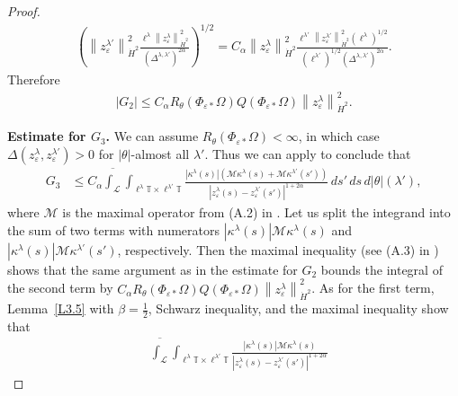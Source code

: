 \documentclass[reqno,centertags,12pt]{amsart}
\theoremstyle{definition}
\numberwithin{equation}{section}
\newcommand{\abs}[1]{\left\lvert#1\right\rvert}
\newcommand{\norm}[1]{\left\|#1\right\|}
\newcommand{\bbT}{{\mathbb{T}}}
\newcommand{\eps}{\varepsilon}
\newcommand{\tht}{\theta}
\begin{document}
\begin{proof}
\begin{align*}
        \left(
            \norm{z_{\eps}^{\lambda'}}_{\dot{H}^{2}}^{2}
            \frac{\ell^{\lambda}\norm{z_{\eps}^{\lambda}}_{\dot{H}^{2}}^{2}}
            {(\Delta^{\lambda,\lambda'})^{2\alpha}}
        \right)^{1/2}
        = C_{\alpha}\norm{z_{\eps}^{\lambda}}_{\dot{H}^{2}}^{2}
        \frac{\ell^{\lambda'}\norm{z_{\eps}^{\lambda'}}_{\dot{H}^{2}}^{2} 
        (\ell^{\lambda})^{1/2}}
        {(\ell^{\lambda'})^{1/2}(\Delta^{\lambda,\lambda'})^{2\alpha}}.
    \end{align*}
    Therefore
    \begin{align*}
        \abs{G_{2}} \leq C_{\alpha}R_{\tht}(\Phi_{\eps*}\Omega)
        Q(\Phi_{\eps*}\Omega)\norm{z_{\eps}^{\lambda}}_{\dot{H}^{2}}^{2}.
    \end{align*}

    \textbf{Estimate for $G_{3}$.} We can assume $R_{\tht}(\Phi_{\eps*}\Omega)<\infty$,
    in which case $\Delta(z_{\eps}^{\lambda},z_{\eps}^{\lambda'}) > 0$
    for $|\theta|$-almost all $\lambda'$.  Thus we can apply \cite[Lemma~A.4]{JeoZlaTouching}
    to conclude that
    \begin{align*}
        G_{3} &\leq C_{\alpha}\overline{\int_{\mathcal{L}}}
        \int_{\ell^{\lambda}\bbT\times \ell^{\lambda'}\bbT}
        \frac{\abs{\kappa^{\lambda}(s)}\left(
            \mathcal{M}\kappa^{\lambda}(s)
            + \mathcal{M}\kappa^{\lambda'}(s')
        \right)}
        {\abs{z_{\eps}^{\lambda}(s) - z_{\eps}^{\lambda'}(s')}^{1+2\alpha}}
        \,ds'\,ds\,d|\theta|(\lambda'),
    \end{align*}
    where $\mathcal{M}$ is the maximal operator from (A.2) in \cite{JeoZlaTouching}.
    Let us split the integrand into the sum of two terms with numerators
    $\abs{\kappa^{\lambda}(s)}\mathcal{M}\kappa^{\lambda}(s)$ and
    $\abs{\kappa^{\lambda}(s)}\mathcal{M}\kappa^{\lambda'}(s')$, respectively.  Then
     the maximal inequality (see (A.3) in \cite{JeoZlaTouching}) shows that  the same argument
    as in the estimate for $G_{2}$ bounds the integral of the second term by
    $C_{\alpha}R_{\tht}(\Phi_{\eps*}\Omega)Q(\Phi_{\eps*}\Omega)
    \norm{z_{\eps}^{\lambda}}_{\dot{H}^{2}}^{2}$.
    As for the first term, Lemma~\ref{L3.5} with $\beta=\frac 12$, Schwarz inequality, and
    the maximal inequality show that
    \begin{align*}
        &\overline{\int_{\mathcal{L}}}
        \int_{\ell^{\lambda}\bbT\times \ell^{\lambda'}\bbT}
        \frac{\abs{\kappa^{\lambda}(s)}\mathcal{M}\kappa^{\lambda}(s)}
        {\abs{z_{\eps}^{\lambda}(s) - z_{\eps}^{\lambda'}(s')}^{1+2\alpha}}

\end{align*}
\end{proof}
\end{document}
